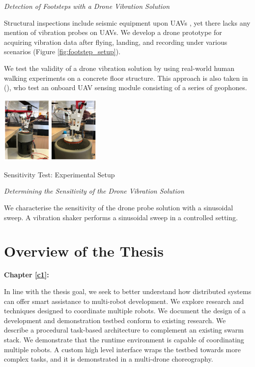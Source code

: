 \textit{Detection of Footsteps with a Drone Vibration Solution}

Structural inspections include seismic equipment upon UAVs \cite{stewart_chang_sudarchan_becker_huang_2016}, yet there lacks any mention of vibration probes on UAVs. We develop a drone prototype for acquiring vibration data after flying, landing, and recording under various scenarios (Figure \ref{fig:footstep_setup}).

We test the validity of a drone vibration solution by using real-world human walking experiments on a concrete floor structure. This approach is also taken in  \cite{gait_analysis} (), who test an onboard UAV sensing module consisting of a series of geophones.


\begin{marginfigure}%
    \raggedright
    \includegraphics[width=5cm]{images/stage_graphs/vibration_results/vibration_test.png}
    \caption{Sensitivity Test: Experimental Setup}
\end{marginfigure}

\textit{Determining the Sensitivity of the Drone Vibration Solution}

We characterise the sensitivity of the drone probe solution with a sinusoidal sweep. A vibration shaker performs a sinusoidal sweep in a controlled setting.


\section{Overview of the Thesis}

\textbf{Chapter \ref{c1}: }

In line with the thesis goal, we seek to better understand how distributed systems can offer smart assistance to multi-robot development. We explore research and techniques designed to coordinate multiple robots.
We document the design of a development and demonstration testbed conform to existing research. We describe a procedural task-based architecture to complement an existing swarm stack. We demonstrate that the runtime environment is capable of coordinating multiple robots. A custom high level interface wraps the testbed towards more complex tasks, and it is demonstrated in a multi-drone choreography.

